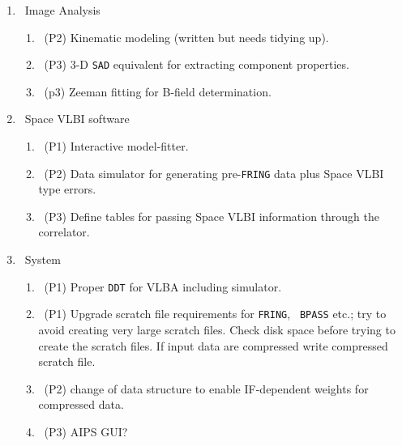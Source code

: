 \begin{enumerate}
\item\ Image Analysis
   \begin{enumerate}
   \item\ (P2) Kinematic modeling (written but needs tidying up).
   \item\ (P3) 3-D {\tt SAD} equivalent for extracting component
              properties.
   \item\ (p3) Zeeman fitting for B-field determination.
   \end{enumerate}
\item\ Space VLBI software
   \begin{enumerate}
   \item\ (P1) Interactive model-fitter.
   \item\ (P2) Data simulator for generating pre-{\tt FRING} data plus
              Space VLBI type errors.
   \item\ (P3) Define tables for passing Space VLBI information through
              the correlator.
   \end{enumerate}
\item\ System
   \begin{enumerate}
   \item\ (P1) Proper {\tt DDT} for VLBA including simulator.
   \item\ (P1) Upgrade scratch file requirements for {\tt FRING}, {\tt
              BPASS} etc.; try to avoid creating very large scratch
              files.  Check disk space before trying to create the
              scratch files. If input data are compressed write
              compressed scratch file.
   \item\ (P2) change of data structure to enable IF-dependent weights
              for compressed data.
   \item\ (P3) AIPS GUI?
   \end{enumerate}
\end{enumerate}

\vfill
\eject
\hphantom{A}
\vfill
{}
\vfill

